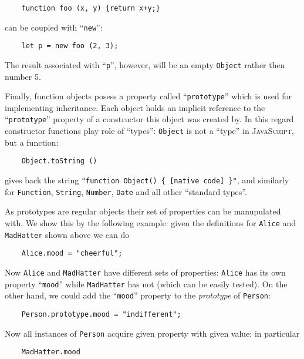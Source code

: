 \documentclass{article}
\newcommand{\js}{\textsc{JavaScript}\xspace}
\begin{document}
\begin{lstlisting}
    function foo (x, y) {return x+y;}
\end{lstlisting}

can be coupled with ``\lstinline|new|'':

\begin{lstlisting}
    let p = new foo (2, 3);
\end{lstlisting}

The result associated with ``\lstinline|p|'', however, will be an empty \lstinline|Object| rather then number 5.

Finally, function objects posess a property called ``\lstinline|prototype|'' which is used for implementing
inheritance. Each object holds an implicit reference to the ``\lstinline|prototype|''
property of a constructor this object was created by. In this regard constructor functions play role of ``types'':
\lstinline|Object| is not a ``type'' in \js, but a function:

\begin{lstlisting}
    Object.toString ()
\end{lstlisting}

gives back the string \lstinline|"function Object() { [native code] }"|, and similarly for \lstinline|Function|,
\lstinline|String|, \lstinline|Number|, \lstinline|Date| and  all other ``standard types''.

As prototypes are regular objects their set of properties can be manupulated with. We show this by the following
example: given the definitions for \lstinline|Alice| and \lstinline|MadHatter| shown above we can do

\begin{lstlisting}
    Alice.mood = "cheerful";
\end{lstlisting}

Now \lstinline|Alice| and \lstinline|MadHatter| have different sets of properties: \lstinline|Alice| has its
own property ``\lstinline|mood|'' while \lstinline|MadHatter| has not (which can be easily
tested). On the other hand, we could add the ``\lstinline|mood|'' property to the \emph{prototype} of
\lstinline|Person|:

\begin{lstlisting}
    Person.prototype.mood = "indifferent";
\end{lstlisting}

Now all instances of \lstinline|Person| acquire given property with given value; in particular

\begin{lstlisting}
    MadHatter.mood
\end{lstlisting}
\end{document}
